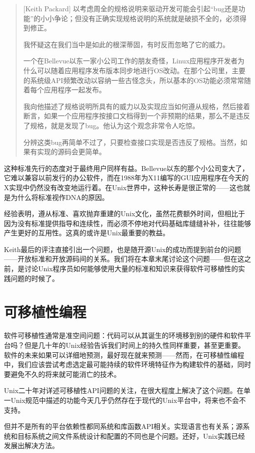 \documentclass[12pt,oneside]{book}
\begin{document}
\begin{quote}[Keith Packard]
以考虑周全的规格说明来驱动开发可能会引起“bug还是功能”的小小争论；但没有正确实现规格说明的系统就是破损不全的，必须得到修正。

我怀疑这在我们当中是如此的根深蒂固，有时反而忽略了它的威力。

一个在Bellevue以东一家小公司工作的朋友奇怪，Linux应用程序开发者为什么可以随着应用程序发布版本同步地进行OS改动。在那个公司里，主要的系统级API频繁改动以容纳一些古怪念头，所以基本的OS功能必须常常随着每个应用程序一起发布。

我向他描述了规格说明所具有的威力以及实现应当如何遵从规格，然后接着断言，如果一个应用程序按接口文档得到一个非预期的结果，那么不是违反了规格，就是发现了bug。他认为这个观念非常令人吃惊。

分辨这类bug再简单不过了，只要检查接口实现是否违反了规格。当然，如果有实现的源码会更简单。
\end{quote}

这种标准先行的态度对于最终用户同样有益。Bellevue以东的那个小公司变大了，它难以兼容以前发行的办公软件，而在1988年为X11编写的GUI应用程序在今天的X实现中仍然没有改变地运行着。在Unix世界中，这种长寿是很正常的——这也就是为什么将标准视作DNA的原因。

经验表明，遵从标准、喜欢抛弃重建的Unix文化，虽然花费额外时间，但相比于因为没有标准提供指导和连续性，而必须不停地对代码基础库缝缝补补，往往能够产生更好的互用性。这真的或许是Unix最重要的教益。

Keith最后的评注直接引出一个问题，也是随开源Unix的成功而提到前台的问题——开放标准和开放源码间的关系。我们将在本章末尾讨论这个问题——但在这之前，是讨论Unix程序员如何能够使用大量的标准和知识来获得软件可移植性的实践问题的时候了。

\section{可移植性编程}
软件可移植性通常是准空间问题：代码可以从其诞生的环境移到别的硬件和软件平台吗？但是几十年的Unix经验告诉我们时间上的持久性同样重要，甚至更重要。软件的未来如果可以详细地预测，最好现在就来预测——然而，在可移植性编程中，我们应该尝试考虑选定最可能持续的软件环境特征作为构建软件的基础，同时要避免不久的将来就可能消亡的技术。

Unix二十年对详述可移植性API问题的关注，在很大程度上解决了这个问题。在单一Unix规范中描述的功能今天几乎仍然存在于现代的Unix平台中，将来也不会不支持。

但并不是所有的平台依赖性都同系统和库函数API相关。实现语言也有关系；源系统和目标系统之间文件系统设计和配置的不同也是个问题。还好，Unix实践已经发展出解决方法。
\end{document}
